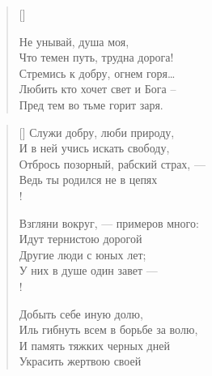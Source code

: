 \newpage
\vspace*{0cm}


\settowidth{\versewidth}{\vinЧто тепен путь, трудна дорога!}
\begin{verse}[\versewidth]
\begin{altverse}
Не унывай, душа моя,\\
 Что темен путь, трудна дорога!\\
Стремись к добру, огнем горя…\\
 Любить кто хочет свет и Бога –\\
Пред тем во тьме горит заря.
\end{altverse}
\end{verse}

\newpage
\vspace*{0cm}


\settowidth{\versewidth}{Взгляни вокруг, --- примеров много:}
\begin{verse}[\versewidth]
Служи добру, люби природу,\\
И в ней учись искать свободу,\\
Отбрось позорный, рабский страх, ---\\
Ведь ты родился не в цепях\ldotst\\!

Взгляни вокруг, --- примеров много:\\
Идут тернистою дорогой\\
Другие люди с юных лет;\\
У них в душе один завет ---\\!

Добыть себе иную долю,\\
Иль гибнуть всем в борьбе за волю,\\
И память тяжких черных дней\\
Украсить жертвою своей\ldotst
\end{verse}

\newpage
\vspace*{0cm}


